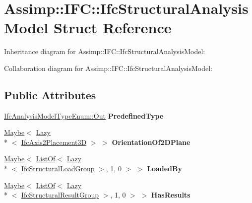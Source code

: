 \hypertarget{struct_assimp_1_1_i_f_c_1_1_ifc_structural_analysis_model}{\section{Assimp\+:\+:I\+F\+C\+:\+:Ifc\+Structural\+Analysis\+Model Struct Reference}
\label{struct_assimp_1_1_i_f_c_1_1_ifc_structural_analysis_model}
}


Inheritance diagram for Assimp\+:\+:I\+F\+C\+:\+:Ifc\+Structural\+Analysis\+Model\+:


Collaboration diagram for Assimp\+:\+:I\+F\+C\+:\+:Ifc\+Structural\+Analysis\+Model\+:
\subsection*{Public Attributes}
\begin{DoxyCompactItemize}
\item 
\hypertarget{struct_assimp_1_1_i_f_c_1_1_ifc_structural_analysis_model_a5a173b16618869132e2b85a86a3fa7a6}{\hyperlink{classboost_1_1shared__ptr}{Ifc\+Analysis\+Model\+Type\+Enum\+::\+Out} {\bfseries Predefined\+Type}}\label{struct_assimp_1_1_i_f_c_1_1_ifc_structural_analysis_model_a5a173b16618869132e2b85a86a3fa7a6}

\item 
\hypertarget{struct_assimp_1_1_i_f_c_1_1_ifc_structural_analysis_model_a67e01ee49f245ae00da4e965ed93fe0b}{\hyperlink{struct_assimp_1_1_s_t_e_p_1_1_maybe}{Maybe}$<$ \hyperlink{struct_assimp_1_1_s_t_e_p_1_1_lazy}{Lazy}\\*
$<$ \hyperlink{struct_assimp_1_1_i_f_c_1_1_ifc_axis2_placement3_d}{Ifc\+Axis2\+Placement3\+D} $>$ $>$ {\bfseries Orientation\+Of2\+D\+Plane}}\label{struct_assimp_1_1_i_f_c_1_1_ifc_structural_analysis_model_a67e01ee49f245ae00da4e965ed93fe0b}

\item 
\hypertarget{struct_assimp_1_1_i_f_c_1_1_ifc_structural_analysis_model_a6a23533af50653cee53ade47b6c8669a}{\hyperlink{struct_assimp_1_1_s_t_e_p_1_1_maybe}{Maybe}$<$ \hyperlink{struct_assimp_1_1_s_t_e_p_1_1_list_of}{List\+Of}$<$ \hyperlink{struct_assimp_1_1_s_t_e_p_1_1_lazy}{Lazy}\\*
$<$ \hyperlink{struct_assimp_1_1_i_f_c_1_1_ifc_structural_load_group}{Ifc\+Structural\+Load\+Group} $>$, 1, 0 $>$ $>$ {\bfseries Loaded\+By}}\label{struct_assimp_1_1_i_f_c_1_1_ifc_structural_analysis_model_a6a23533af50653cee53ade47b6c8669a}

\item 
\hypertarget{struct_assimp_1_1_i_f_c_1_1_ifc_structural_analysis_model_a90e9ac127600ab9e7b42e0d353a26de1}{\hyperlink{struct_assimp_1_1_s_t_e_p_1_1_maybe}{Maybe}$<$ \hyperlink{struct_assimp_1_1_s_t_e_p_1_1_list_of}{List\+Of}$<$ \hyperlink{struct_assimp_1_1_s_t_e_p_1_1_lazy}{Lazy}\\*
$<$ \hyperlink{struct_assimp_1_1_i_f_c_1_1_ifc_structural_result_group}{Ifc\+Structural\+Result\+Group} $>$, 1, 0 $>$ $>$ {\bfseries Has\+Results}}\label{struct_assimp_1_1_i_f_c_1_1_ifc_structural_analysis_model_a90e9ac127600ab9e7b42e0d353a26de1}

\end{DoxyCompactItemize}
